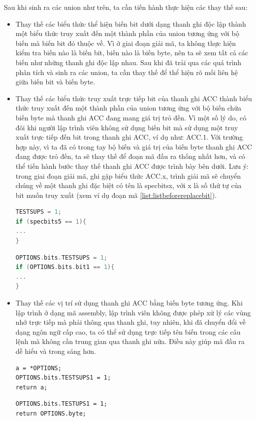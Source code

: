 Sau khi sinh ra các union như trên, ta cần tiến hành thực hiện các thay thế sau:
\begin{itemize}
\item Thay thế các biểu thức thể hiện biến bit dưới dạng thanh ghi độc lập thành một biểu thức truy xuất đến một thành phần của union tương ứng với bộ biến mà biến bit đó thuộc về. Vì ở giai đoạn giải mã, ta không thực hiện kiểm tra biến nào là biến bit, biến nào là biến byte, nên ta sẽ xem tất cả các biến như những thanh ghi độc lập nhau. Sau khi đã trải qua các quá trình phân tích và sinh ra các union, ta cần thay thế để thể hiện rõ mối liên hệ giữa biến bit và biến byte.

\item Thay thế các biểu thức truy xuất trực tiếp bit của thanh ghi ACC thành biểu thức truy xuất đến một thành phần của union tương ứng với bộ biến chứa biến byte mà thanh ghi ACC đang mang giá trị trỏ đến. Vì một số lý do, có đôi khi người lập trình viên không sử dụng biến bit mà sử dụng một truy xuất trực tiếp đến bit trong thanh ghi ACC, ví dụ như: ACC.1. Với trường hợp này, vì ta đã có trong tay bộ biến và giá trị của biến byte thanh ghi ACC đang được trỏ đến, ta sẽ thay thế để đoạn mã đầu ra thống nhất hơn, và có thể tiến hành bước thay thế thanh ghi ACC được trình bày bên dưới. Lưu ý: trong giai đoạn giải mã, ghi gặp biểu thức ACC.x, trình giải mã sẽ chuyển chúng về một thanh ghi đặc biệt có tên là specbitsx, với x là số thứ tự của bit muốn truy xuất (xem ví dụ đoạn mã \ref{list:listbeforereplacebit}).
\begin{lstlisting}[caption={Mã đầu ra trước khi thực hiện bước thay thế biến bit},label={list:listbeforereplacebit}, language = c]
TESTSUPS = 1;
if (specbits5 == 1){
...
}
\end{lstlisting}

\begin{lstlisting}[caption={Mã đầu ra sau khi thực hiện bước thay thế biến bit},label={list:listafterreplacebit}, language = c]
OPTIONS.bits.TESTSUPS = 1;
if (OPTIONS.bits.bit1 == 1){
...
}
\end{lstlisting}
\item Thay thế các vị trí sử dụng thanh ghi ACC bằng biến byte tương ứng. Khi lập trình ở dạng mã assembly, lập trình viên không được phép xử lý các vùng nhớ trực tiếp mà phải thông qua thanh ghi, tuy nhiên, khi đã chuyển đổi về dạng ngôn ngữ cấp cao, ta có thể sử dụng trực tiếp tên biến trong các câu lệnh mà không cần trung gian qua thanh ghi nữa. Điều này giúp mã đầu ra dễ hiểu và trong sáng hơn.

\begin{lstlisting}[caption={Mã đầu ra trước khi thực hiện bước thay thế thanh ghi ACC},label={list:listbeforereplace}]
a = *OPTIONS;
OPTIONS.bits.TESTSUPS1 = 1;
return a;
\end{lstlisting}
\begin{lstlisting}[caption={Mã đầu ra sau khi thực hiện bước thay thế thanh ghi ACC},label={list:listafterreplace}]
OPTIONS.bits.TESTUPS1 = 1;
return OPTIONS.byte;
\end{lstlisting}
\end{itemize}





